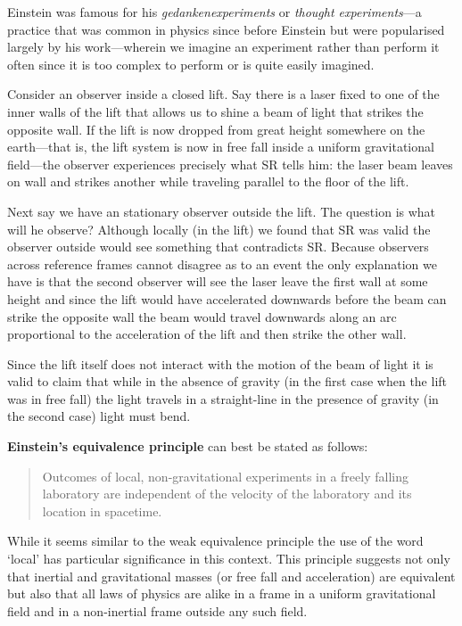 \documentclass[english,seminar]{lecture}
\begin{document}
Einstein was famous for his \textit{gedankenexperiments} or \textit{thought experiments}---a practice that was common in physics since before Einstein but were popularised largely by his work---wherein we imagine an experiment rather than perform it often since it is too complex to perform or is quite easily imagined.

Consider an observer inside a closed lift. Say there is a laser fixed to one of the inner walls of the lift that allows us to shine a beam of light that strikes the opposite wall. If the lift is now dropped from great height somewhere on the earth---that is, the lift system is now in free fall inside a uniform gravitational field---the observer experiences precisely what SR tells him: the laser beam leaves on wall and strikes another while traveling parallel to the floor of the lift.

Next say we have an stationary observer outside the lift. The question is what will he observe? Although locally (in the lift) we found that SR was valid the observer outside would see something that contradicts SR. Because observers across reference frames cannot disagree as to an event the only explanation we have is that the second observer will see the laser leave the first wall at some height and since the lift would have accelerated downwards before the beam can strike the opposite wall the beam would travel downwards along an arc proportional to the acceleration of the lift and then strike the other wall.

Since the lift itself does not interact with the motion of the beam of light it is valid to claim that while in the absence of gravity (in the first case when the lift was in free fall) the light travels in a straight-line in the presence of gravity (in the second case) light must bend.\newline

\noindent \textbf{Einstein's equivalence principle} can best be stated as follows:
\begin{quote}
	Outcomes of local, non-gravitational experiments in a freely falling laboratory are independent of the velocity of the laboratory and its location in spacetime.
\end{quote}
While it seems similar to the weak equivalence principle the use of the word `local' has particular significance in this context. This principle suggests not only that inertial and gravitational masses (or free fall and acceleration) are equivalent but also that all laws of physics are alike in a frame in a uniform gravitational field and in a non-inertial frame outside any such field.
\end{document}
